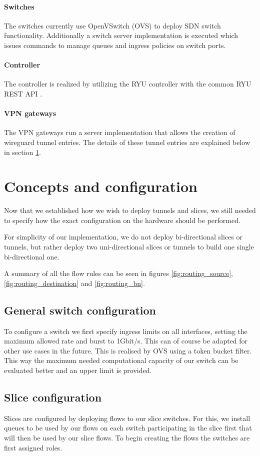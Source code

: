 \paragraph{Switches} The switches currently use OpenVSwitch (OVS) \cite{openvswitch} to deploy SDN switch functionality. Additionally a switch server implementation is executed which issues commands to manage queues and ingress policies on switch ports.
\paragraph{Controller} The controller is realized by utilizing the RYU controller \cite{ryu} with the common RYU REST API \cite{ryu-rest}.
\paragraph{VPN gateways} The VPN gateways run a server implementation that allows the creation of wireguard \cite{wireguard} tunnel entries. The details of these tunnel entries are explained below in section \ref{impl_concepts}.

\section{Concepts and configuration}
\label{impl_concepts}
Now that we established how we wish to deploy tunnels and slices, we still needed to specify how the exact configuration on the hardware should be performed.

For simplicity of our implementation, we do not deploy bi-directional slices or tunnels, but rather deploy two uni-directional slices or tunnels to build one single bi-directional one.

A summary of all the flow rules can be seen in figures \ref{fig:routing_source}, \ref{fig:routing_destination} and \ref{fig:routing_bn}.

\subsection{General switch configuration}
To configure a switch we first specify ingress limits on all interfaces, setting the maximum allowed rate and burst to 1Gbit/s. This can of course be adapted for other use cases in the future. This is realised by OVS using a token bucket filter. This way the maximum needed computational capacity of our switch can be evaluated better and an upper limit is provided.

\subsection{Slice configuration}
Slices are configured by deploying flows to our slice switches. For this, we install queues to be used by our flows on each switch participating in the slice first that will then be used by our slice flows. To begin creating the flows the switches are first assigned roles.

